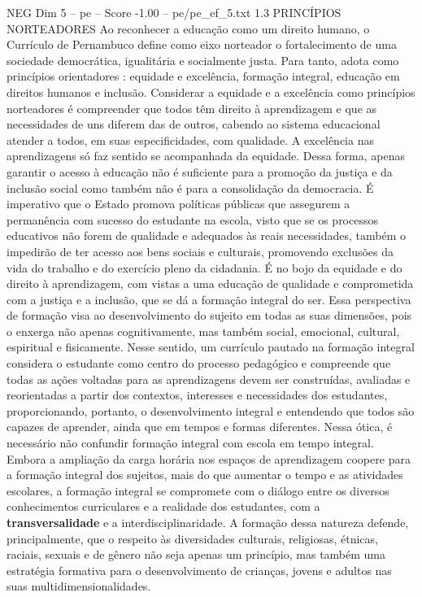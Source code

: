 \begin{textsample}{NEG Dim 5 – pe – Score -1.00 – pe/pe\_ef\_5.txt}  \label{ex:f5_neg_084}
1.3 PRINCÍPIOS NORTEADORES Ao reconhecer a educação como um direito humano, o Currículo de Pernambuco define como eixo norteador o fortalecimento de uma sociedade democrática, igualitária e socialmente justa.
Para tanto, adota como princípios orientadores : equidade e excelência, formação integral, educação em direitos humanos e inclusão.
Considerar a equidade e a excelência como princípios norteadores é compreender que todos têm direito à aprendizagem e que as necessidades de uns diferem das de outros, cabendo ao sistema educacional atender a todos, em suas especificidades, com qualidade.
A excelência nas aprendizagens só faz sentido se acompanhada da equidade.
Dessa forma, apenas garantir o acesso à educação não é suficiente para a promoção da justiça e da inclusão social como também não é para a consolidação da democracia.
É imperativo que o Estado promova políticas públicas que assegurem a permanência com sucesso do estudante na escola, visto que se os processos educativos não forem de qualidade e adequados às reais necessidades, também o impedirão de ter acesso aos bens sociais e culturais, promovendo exclusões da vida do trabalho e do exercício pleno da cidadania.
É no bojo da equidade e do direito à aprendizagem, com vistas a uma educação de qualidade e comprometida com a justiça e a inclusão, que se dá a formação integral do ser.
Essa perspectiva de formação visa ao desenvolvimento do sujeito em todas as suas dimensões, pois o enxerga não apenas cognitivamente, mas também social, emocional, cultural, espiritual e fisicamente.
Nesse sentido, um currículo pautado na formação integral considera o estudante como centro do processo pedagógico e compreende que todas as ações voltadas para as aprendizagens devem ser construídas, avaliadas e reorientadas a partir dos contextos, interesses e necessidades dos estudantes, proporcionando, portanto, o desenvolvimento integral e entendendo que todos são capazes de aprender, ainda que em tempos e formas diferentes.
Nessa ótica, é necessário não confundir formação integral com escola em tempo integral.
Embora a ampliação da carga horária nos espaços de aprendizagem coopere para a formação integral dos sujeitos, mais do que aumentar o tempo e as atividades escolares, a formação integral se compromete com o diálogo entre os diversos conhecimentos curriculares e a realidade dos estudantes, com a \textbf{transversalidade} e a interdisciplinaridade.
A formação dessa natureza defende, principalmente, que o respeito às diversidades culturais, religiosas, étnicas, raciais, sexuais e de gênero não seja apenas um princípio, mas também uma estratégia formativa para o desenvolvimento de crianças, jovens e adultos nas suas multidimensionalidades.

\end{textsample}
